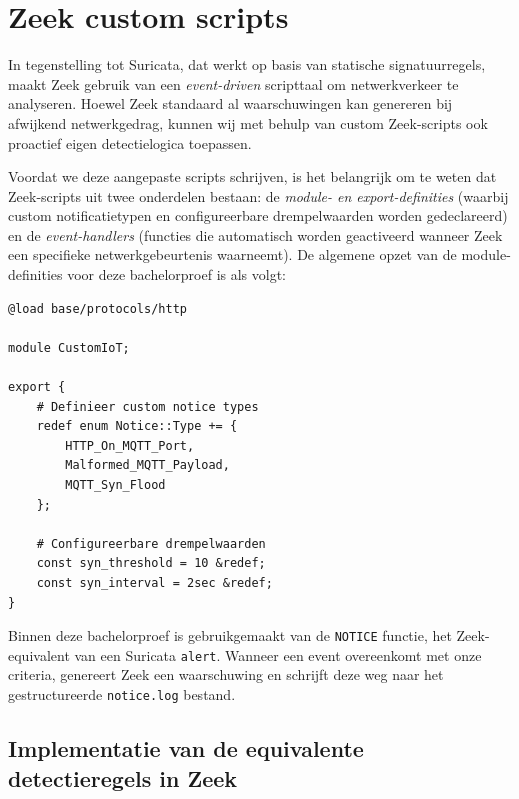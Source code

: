 \section{Zeek custom scripts}

In tegenstelling tot Suricata, dat werkt op basis van statische signatuurregels, maakt Zeek gebruik van een \textit{event-driven} scripttaal om netwerkverkeer te analyseren. Hoewel Zeek standaard al waarschuwingen kan genereren bij afwijkend netwerkgedrag, kunnen wij met behulp van custom Zeek-scripts ook proactief eigen detectielogica toepassen.

Voordat we deze aangepaste scripts schrijven, is het belangrijk om te weten dat Zeek-scripts uit twee onderdelen bestaan: de \textit{module- en export-definities} (waarbij custom notificatietypen en configureerbare drempelwaarden worden gedeclareerd) en de \textit{event-handlers} (functies die automatisch worden geactiveerd wanneer Zeek een specifieke netwerkgebeurtenis waarneemt). De algemene opzet van de module-definities voor deze bachelorproef is als volgt:

\begin{listing}[H]
\begin{verbatim}
@load base/protocols/http

module CustomIoT;

export {
    # Definieer custom notice types
    redef enum Notice::Type += {
        HTTP_On_MQTT_Port,
        Malformed_MQTT_Payload,
        MQTT_Syn_Flood
    };

    # Configureerbare drempelwaarden
    const syn_threshold = 10 &redef;
    const syn_interval = 2sec &redef;
}
\end{verbatim}
\caption{Basisconfiguratie en variabele declaraties van de \texttt{CustomIoT} module in Zeek.}
\label{lst:zeek-module}
\end{listing}


Binnen deze bachelorproef is gebruikgemaakt van de \texttt{NOTICE} functie, het Zeek-equivalent van een Suricata \texttt{alert}. Wanneer een event overeenkomt met onze criteria, genereert Zeek een waarschuwing en schrijft deze weg naar het gestructureerde \texttt{notice.log} bestand.

\subsection{Implementatie van de equivalente detectieregels in Zeek}

